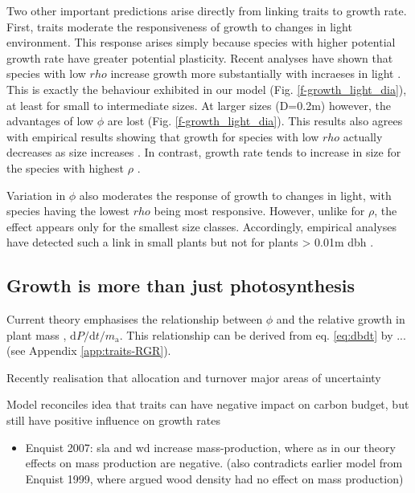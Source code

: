 \documentclass[12pt, a4paper]{article}
\begin{document}
Two other important predictions arise directly from linking traits to
growth rate. First, traits moderate the
responsiveness of growth to changes in light environment. This response
arises simply because species with higher potential growth rate have
greater potential plasticity. Recent analyses have shown that species
with low $rho$ increase growth more substantially with incraeses in
light \citep{ruger-2012}. This is exactly the behaviour
exhibited in our model (Fig. \ref{f-growth_light_dia}), at least for small
to intermediate sizes. At larger sizes (D=0.2m) however, the advantages
of low $\phi$ are lost (Fig. \ref{f-growth_light_dia}). This results also
agrees with empirical results showing that growth for species with low
$rho$ actually decreases as size
increases \citep{ruger-2012}. In contrast, growth rate tends
to increase in size for the species with highest
$\rho$ \citep{ruger-2012}.


Variation in $\phi$ also moderates the response of growth to changes
in light, with species having the lowest $rho$ being most responsive.
However, unlike for $\rho$, the effect appears only for the smallest
size classes. Accordingly, empirical analyses have detected such a link
in small plants but not for plants \textgreater{} 0.01m
dbh \citep{ruger-2012}.

\subsection{Growth is more than just photosynthesis}\label{tree-growth-is-more-than-just-photosynthesis}

Current theory emphasises the relationship between $\phi$ and the relative growth in plant mass
\citep{lambers-1992, cornelissen-1996, wright_cross-2000,  enquist-2007},
$\textrm{d}P / \textrm{d}t / m_\textrm{a}$. This relationship can be derived from eq. \ref{eq:dbdt}  by ...
(see Appendix \ref{app:traits-RGR}).

Recently realisation that allocation and turnover major areas of
uncertainty

Model reconciles idea that traits can have negative impact on carbon
budget, but still have positive influence on growth rates

\begin{itemize}
\itemsep1pt\parskip0pt
\item
  Enquist 2007: sla and wd increase mass-production, where as in our
  theory effects on mass production are negative. (also contradicts
  earlier model from Enquist 1999, where argued wood density had no
  effect on mass production)
\end{itemize}
\end{document}
